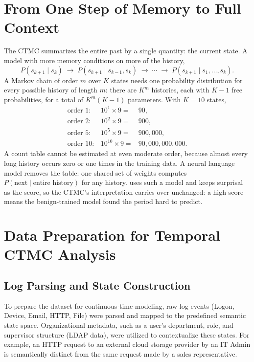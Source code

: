 \section{From One Step of Memory to Full Context}
\label{sec:ctmc-bridge}
The CTMC summarizes the entire past by a single quantity: the current state. A model with
more memory conditions on more of the history,
\[
P(s_{k+1}\mid s_k)
\;\longrightarrow\;
P(s_{k+1}\mid s_{k-1}, s_k)
\;\longrightarrow\; \cdots \;\longrightarrow\;
P(s_{k+1}\mid s_1, \dots, s_k).
\]
A Markov chain of order $m$ over $K$ states needs one probability distribution for every
possible history of length $m$: there are $K^m$ histories, each with $K-1$ free
probabilities, for a total of $K^m(K-1)$ parameters. With $K = 10$ states,
\[
\begin{array}{lcl}
\text{order } 1: & 10^1 \times 9 = & 90, \\
\text{order } 2: & 10^2 \times 9 = & 900, \\
\text{order } 5: & 10^5 \times 9 = & 900{,}000, \\
\text{order } 10: & 10^{10} \times 9 = & 90{,}000{,}000{,}000.
\end{array}
\]
A count table cannot be estimated at even moderate order, because almost every long history
occurs zero or one times in the training data. A neural language model removes the table:
one shared set of weights computes $P(\text{next}\mid\text{entire history})$ for any history.
 uses such a model and keeps surprisal as the score, so the CTMC's
interpretation carries over unchanged: a high score means the benign-trained model found the
period hard to predict.

\newpage


\section{Data Preparation for Temporal CTMC Analysis}

\subsection{Log Parsing and State Construction}
To prepare the dataset for continuous-time modeling, raw log events (Logon, Device, Email, HTTP, File) were parsed and mapped to the predefined semantic state space. Organizational metadata, such as a user's department, role, and supervisor structure (LDAP data), were utilized to contextualize these states. For example, an HTTP request to an external cloud storage provider by an IT Admin is semantically distinct from the same request made by a sales representative.

